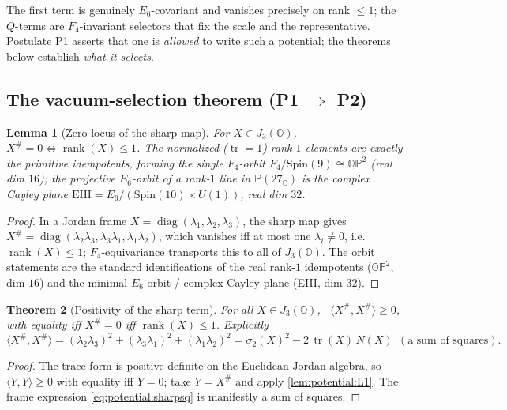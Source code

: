\documentclass[11pt]{article}
\theoremstyle{plain}
\newtheorem{theorem}{Theorem}[section]
\newtheorem{lemma}[theorem]{Lemma}
\theoremstyle{definition}
\theoremstyle{remark}
\begin{document}
The first term is genuinely $E_6$-covariant and vanishes precisely on rank $\le1$; the
$Q$-terms are $F_4$-invariant selectors that fix the scale and the representative. Postulate
P1 asserts that one is \emph{allowed} to write such a potential; the theorems below establish
\emph{what it selects}.

\subsection{The vacuum-selection theorem (P1 \texorpdfstring{$\Rightarrow$}{=>} P2)}
\label{sec:potential:theorem}

\begin{lemma}[Zero locus of the sharp map]
\label{lem:potential:L1}
For $X\in J_3(\mathbb O)$, \ $X^\#=0\iff\operatorname{rank}(X)\le1$. The normalized
($\operatorname{tr}=1$) rank-$1$ elements are exactly the primitive idempotents, forming the
single $F_4$-orbit $F_4/\mathrm{Spin}(9)\cong\mathbb{OP}^2$ (real dim $16$); the
projective $E_6$-orbit of a rank-$1$ line in $\mathbb P(27_{\mathbb C})$ is the complex
Cayley plane $\mathrm{EIII}=E_6/(\mathrm{Spin}(10)\times U(1))$, real dim $32$.
\end{lemma}

\begin{proof}
In a Jordan frame $X=\operatorname{diag}(\lambda_1,\lambda_2,\lambda_3)$, the sharp map gives
$X^\#=\operatorname{diag}(\lambda_2\lambda_3,\lambda_3\lambda_1,\lambda_1\lambda_2)$, which
vanishes iff at most one $\lambda_i\neq0$, i.e. $\operatorname{rank}(X)\le1$; $F_4$-equivariance
transports this to all of $J_3(\mathbb O)$. The orbit statements are the standard
identifications of the real rank-$1$ idempotents ($\mathbb{OP}^2$, dim $16$) and the minimal
$E_6$-orbit / complex Cayley plane (EIII, dim $32$).
\end{proof}

\begin{theorem}[Positivity of the sharp term]
\label{thm:potential:T1}
For all $X\in J_3(\mathbb O)$, \ $\langle X^\#,X^\#\rangle\ge0$, with equality iff $X^\#=0$
iff $\operatorname{rank}(X)\le1$. Explicitly
\begin{equation}
\label{eq:potential:sharpsq}
\langle X^\#,X^\#\rangle=(\lambda_2\lambda_3)^2+(\lambda_3\lambda_1)^2+(\lambda_1\lambda_2)^2
=\sigma_2(X)^2-2\,\operatorname{tr}(X)\,N(X)\ \ (\text{a sum of squares}).
\end{equation}
\end{theorem}

\begin{proof}
The trace form is positive-definite on the Euclidean Jordan algebra, so $\langle Y,Y\rangle\ge0$
with equality iff $Y=0$; take $Y=X^\#$ and apply \autoref{lem:potential:L1}. The frame
expression \eqref{eq:potential:sharpsq} is manifestly a sum of squares.
\end{proof}
\end{document}
